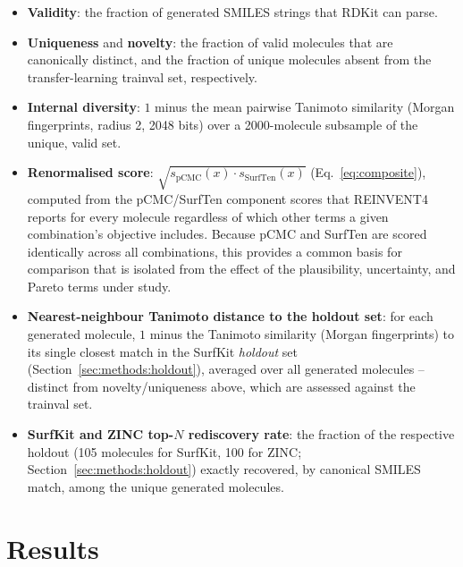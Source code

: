 \documentclass[11pt]{aime}
\begin{document}
\begin{itemize}
    \item \textbf{Validity}: the fraction of generated SMILES strings that RDKit can parse.
    \item \textbf{Uniqueness} and \textbf{novelty}: the fraction of valid molecules that are canonically distinct, and the fraction of unique molecules absent from the transfer-learning trainval set, respectively.
    \item \textbf{Internal diversity}: $1$ minus the mean pairwise Tanimoto similarity (Morgan fingerprints\cite{rogers_extended-connectivity_2010}, radius 2, 2048 bits) over a 2000-molecule subsample of the unique, valid set.
    \item \textbf{Renormalised score}: $\sqrt{s_\mathrm{pCMC}(x)\cdot s_\mathrm{SurfTen}(x)}$ (Eq.~\ref{eq:composite}), computed from the pCMC/SurfTen component scores that REINVENT4 reports for every molecule regardless of which other terms a given combination's objective includes.
    Because pCMC and SurfTen are scored identically across all combinations, this provides a common basis for comparison that is isolated from the effect of the plausibility, uncertainty, and Pareto terms under study.
    \item \textbf{Nearest-neighbour Tanimoto distance to the holdout set}: for each generated molecule, $1$ minus the Tanimoto similarity (Morgan fingerprints) to its single closest match in the SurfKit \emph{holdout} set (Section~\ref{sec:methods:holdout}), averaged over all generated molecules -- distinct from novelty/uniqueness above, which are assessed against the trainval set.
    \item \textbf{SurfKit and ZINC top-$N$ rediscovery rate}: the fraction of the respective holdout (105 molecules for SurfKit, 100 for ZINC; Section~\ref{sec:methods:holdout}) exactly recovered, by canonical SMILES match, among the unique generated molecules.
\end{itemize}

\section{Results}
\label{sec:results}


\end{document}
